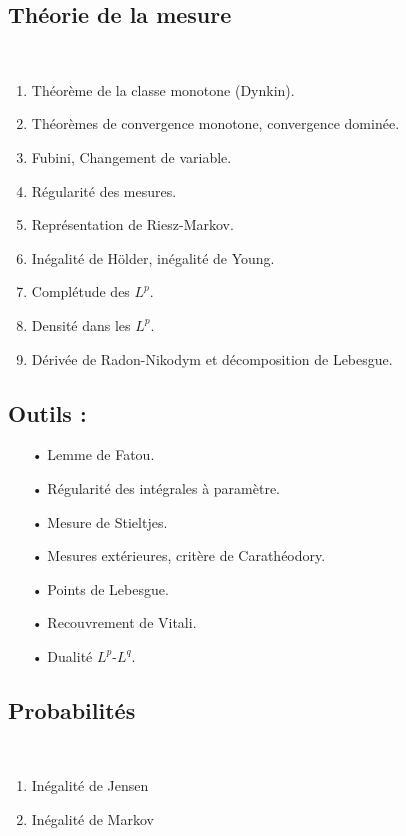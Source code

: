 \documentclass[11pt,a4paper]{article}
\begin{document}
\begin{center}
\section*{Théorie de la mesure} 
\end{center}
~\\
\begin{enumerate}
\item Théorème de la classe monotone (Dynkin).
\item Théorèmes de convergence monotone, convergence dominée.
\item Fubini, Changement de variable.
\item Régularité des mesures.
\item Représentation de Riesz-Markov.
\item Inégalité de Hölder, inégalité de Young.
\item Complétude des $L^p$.
\item Densité dans les $L^p$.
\item Dérivée de Radon-Nikodym et décomposition de Lebesgue.
\end{enumerate}


\subsection*{Outils :}
\begin{itemize}
\item[•] Lemme de Fatou.
\item[•] Régularité des intégrales à paramètre.
\item[•] Mesure de Stieltjes.
\item[•] Mesures extérieures, critère de Carathéodory.
\item[•] Points de Lebesgue.
\item[•] Recouvrement de Vitali.
\item[•] Dualité $L^p$-$L^q$.
\end{itemize}



\newpage\begin{center}
\section*{Probabilités} 
\end{center}
~\\
\begin{enumerate}
\item Inégalité de Jensen
\item Inégalité de Markov
\end{enumerate}
\end{document}
